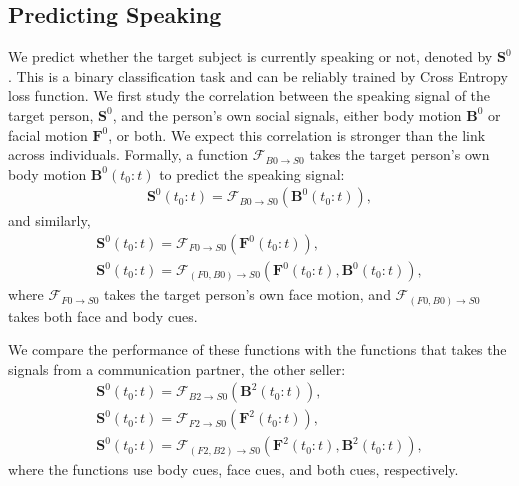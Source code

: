 \subsection{Predicting Speaking}
\label{subsection:ssp_pred_speak}

We predict whether the target subject is currently speaking or not, denoted by $\mathbf{S}^0$.  This is a binary classification task and can be reliably trained by Cross Entropy loss function. We first study the correlation between the speaking signal of the target person, $\mathbf{S}^0$, and the person's own social signals, either body motion $\mathbf{B}^0$ or facial motion $\mathbf{F}^0$, or both. We expect this correlation is stronger than the link across individuals. Formally, a function $\mathcal{F}_{B0\rightarrow S0}$ takes the target person's own body motion $\mathbf{B}^0(t_0:t)$ to predict the speaking signal:
\begin{gather}	
\mathbf{S}^0(t_0:t) = \mathcal{F}_{B0\rightarrow S0} \left( \mathbf{B}^0(t_0:t) \right),
\label{eq:speaking_0}
\end{gather}
and similarly,
\begin{gather}	
\mathbf{S}^0(t_0:t) = \mathcal{F}_{F0\rightarrow S0} \left( \mathbf{F}^0(t_0:t) \right),\\
\mathbf{S}^0(t_0:t) = \mathcal{F}_{(F0, B0)\rightarrow S0} \left( \mathbf{F}^0(t_0:t) , \mathbf{B}^0(t_0:t)\right),
\label{eq:speaking_0_facebody}
\end{gather}
where $\mathcal{F}_{F0\rightarrow S0}$ takes the target person's own face motion, and $\mathcal{F}_{(F0, B0)\rightarrow S0}$ takes both face and body cues. 

We compare the performance of these functions with the functions that takes the signals from a communication partner, the other seller:
\begin{gather}	
\mathbf{S}^0(t_0:t) = \mathcal{F}_{B2\rightarrow S0} \left( \mathbf{B}^2(t_0:t) \right),\\
\mathbf{S}^0(t_0:t) = \mathcal{F}_{F2\rightarrow S0} \left( \mathbf{F}^2(t_0:t) \right),\\
\mathbf{S}^0(t_0:t) = \mathcal{F}_{(F2, B2)\rightarrow S0} \left( \mathbf{F}^2(t_0:t), \mathbf{B}^2(t_0:t) \right),
\label{eq:speaking_1}
\end{gather}
where the functions use body cues, face cues, and both cues, respectively. 

